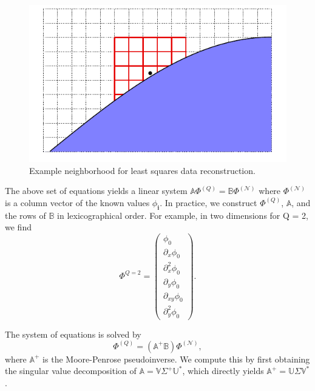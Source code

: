 \documentclass[3p]{elsarticle}
\begin{document}
\begin{figure}[ht]
  \centering
  \includegraphics{./figures/lsq_neighborhood}
  \caption{Example neighborhood for least squares data reconstruction.}
  \label{fig:lsq_neighborhood}
\end{figure}

The above set of equations yields a linear system $\mathbb{A}\Phi^{(Q)} = \mathbb{B}\Phi^{(\mathcal{N})}$ where $\Phi^{(\mathcal{N})}$ is a column vector of the known values $\phi_{\bm{i}}$. In practice, we construct $\Phi^{(Q)}$, $\mathbb{A}$, and the rows of $\mathbb{B}$ in lexicographical order. For example, in two dimensions for Q = 2, we find
\begin{equation}
  \label{eq:q2_example}
  \Phi^{Q = 2} = 
  \begin{pmatrix}
    \phi_0 \\
    \partial_x\phi_0 \\
    \partial^2_x\phi_0 \\
    \partial_y\phi_0 \\
    \partial_{xy}\phi_0 \\
    \partial^2_y\phi_0
  \end{pmatrix}.
\end{equation}

The system of equations is solved by
\begin{equation}
  \Phi^{(Q)} = \left(\mathbb{A}^+\mathbb{B}\right)\Phi^{(\mathcal{N})},
\end{equation}
where $\mathbb{A}^+$ is the Moore-Penrose pseudoinverse. We compute this by first obtaining the singular value decomposition of $\mathbb{A} = \mathbb{V}\Sigma^+ \mathbb{U}^\ast$, which directly yields $\mathbb{A}^+ = \mathbb{U}\Sigma\mathbb{V}^\ast$.
\end{document}
